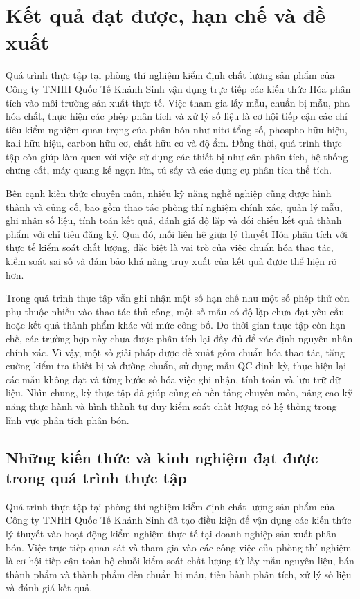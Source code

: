 \chapter{Kết quả đạt được, hạn chế và đề xuất}

Quá trình thực tập tại phòng thí nghiệm kiểm định chất lượng sản phẩm của Công ty TNHH Quốc Tế Khánh Sinh vận dụng trực tiếp các kiến thức Hóa phân tích vào môi trường sản xuất thực tế. Việc tham gia lấy mẫu, chuẩn bị mẫu, pha hóa chất, thực hiện các phép phân tích và xử lý số liệu là cơ hội tiếp cận các chỉ tiêu kiểm nghiệm quan trọng của phân bón như nitơ tổng số, phospho hữu hiệu, kali hữu hiệu, carbon hữu cơ, chất hữu cơ và độ ẩm. Đồng thời, quá trình thực tập còn giúp làm quen với việc sử dụng các thiết bị như cân phân tích, hệ thống chưng cất, máy quang kế ngọn lửa, tủ sấy và các dụng cụ phân tích thể tích.

Bên cạnh kiến thức chuyên môn, nhiều kỹ năng nghề nghiệp cũng được hình thành và củng cố, bao gồm thao tác phòng thí nghiệm chính xác, quản lý mẫu, ghi nhận số liệu, tính toán kết quả, đánh giá độ lặp và đối chiếu kết quả thành phẩm với chỉ tiêu đăng ký. Qua đó, mối liên hệ giữa lý thuyết Hóa phân tích với thực tế kiểm soát chất lượng, đặc biệt là vai trò của việc chuẩn hóa thao tác, kiểm soát sai số và đảm bảo khả năng truy xuất của kết quả được thể hiện rõ hơn.

Trong quá trình thực tập vẫn ghi nhận một số hạn chế như một số phép thử còn phụ thuộc nhiều vào thao tác thủ công, một số mẫu có độ lặp chưa đạt yêu cầu hoặc kết quả thành phẩm khác với mức công bố. Do thời gian thực tập còn hạn chế, các trường hợp này chưa được phân tích lại đầy đủ để xác định nguyên nhân chính xác. Vì vậy, một số giải pháp được đề xuất gồm chuẩn hóa thao tác, tăng cường kiểm tra thiết bị và đường chuẩn, sử dụng mẫu QC định kỳ, thực hiện lại các mẫu không đạt và từng bước số hóa việc ghi nhận, tính toán và lưu trữ dữ liệu. Nhìn chung, kỳ thực tập đã giúp củng cố nền tảng chuyên môn, nâng cao kỹ năng thực hành và hình thành tư duy kiểm soát chất lượng có hệ thống trong lĩnh vực phân tích phân bón.

\section{Những kiến thức và kinh nghiệm đạt được trong quá trình thực tập}

Quá trình thực tập tại phòng thí nghiệm kiểm định chất lượng sản phẩm của Công ty TNHH Quốc Tế Khánh Sinh đã tạo điều kiện để vận dụng các kiến thức lý thuyết vào hoạt động kiểm nghiệm thực tế tại doanh nghiệp sản xuất phân bón. 
Việc trực tiếp quan sát và tham gia vào các công việc của phòng thí nghiệm là cơ hội tiếp cận toàn bộ chuỗi kiểm soát chất lượng từ lấy mẫu nguyên liệu, bán thành phẩm và thành phẩm đến chuẩn bị mẫu, tiến hành phân tích, xử lý số liệu và đánh giá kết quả.

